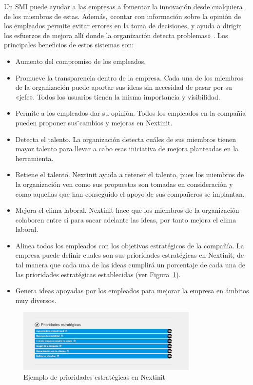  Un \acf{SMI} puede ayudar a las empresas a fomentar la innovación desde cualquiera de los miembros de 
 estas. Además, «contar con información sobre la opinión de los empleados permite evitar errores en la toma
  de decisiones, y ayuda a dirigir los esfuerzos de mejora allí donde la organización detecta problemas»
   \cite{talento}. Los principales beneficios de estos sistemas son:
 
 \begin{itemize}
 	\item Aumento del compromiso de los empleados. 
 	\item Promueve la transparencia dentro de la empresa. Cada una de los miembros de la organización
 	puede aportar sus ideas sin necesidad de pasar por 	su «jefe». Todos los usuarios tienen la misma
 	 importancia y visibilidad.
 	\item Permite a los empleados dar su opinión. Todos los empleados en la compañía pueden proponer sus  ̈cambios y mejoras en Nextinit.
 	\item Detecta el talento. La organización detecta cuáles de sus miembros tienen
 	mayor talento para llevar a cabo esas iniciativa de mejora planteadas en la herramienta.
 	\item Retiene el talento. Nextinit ayuda a retener el talento, pues los miembros de la organización
 	 ven como sus propuestas son tomadas en consideración y como aquellas que han conseguido el apoyo de
 	  sus compañeros se implantan.
 	\item Mejora el clima laboral. Nextinit hace que los miembros de la organización colaboren entre sí 
 	para sacar adelante las ideas, por tanto mejora el clima laboral.
 	\item Alinea todos los empleados con los objetivos estratégicos de la compañía. La empresa puede definir cuales son sus prioridades estratégicas en Nextinit, de tal manera que cada una de las ideas 
 	cumplirá un porcentaje de cada una de las prioridades estratégicas establecidas (ver Figura~\ref{fig:prioridades}).
 	\item Genera ideas apoyadas por los empleados para mejorar la empresa en ámbitos muy diversos.
 \end{itemize}

\begin{figure}[!h]
	\begin{center}
		\includegraphics[width=0.8\textwidth]{./img/introduccion/prioridades.png}
		\caption{Ejemplo de prioridades estratégicas en Nextinit}
		\label{fig:prioridades}
	\end{center}
\end{figure}
  
